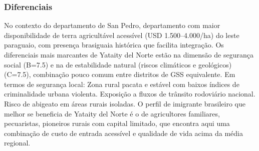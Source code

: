 \subsubsection*{Diferenciais}\label{dif-yataity-del-norte-0215}
No contexto do departamento de San Pedro, departamento com maior disponibilidade de terra agricultável acessível (USD 1.500–4.000/ha) do leste paraguaio, com presença brasiguaia histórica que facilita integração. Os diferenciais mais marcantes de Yataity del Norte estão na dimensão de segurança social (B=7.5) e na de estabilidade natural (riscos climáticos e geológicos) (C=7.5), combinação pouco comum entre distritos de GSS equivalente. Em termos de segurança local: Zona rural pacata e estável com baixos índices de criminalidade urbana violenta. Exposição a fluxos de trânsito rodoviário nacional. Risco de abigeato em áreas rurais isoladas. O perfil de imigrante brasileiro que melhor se beneficia de Yataity del Norte é o de agricultores familiares, pecuaristas, pioneiros rurais com capital limitado, que encontra aqui uma combinação de custo de entrada acessível e qualidade de vida acima da média regional.
